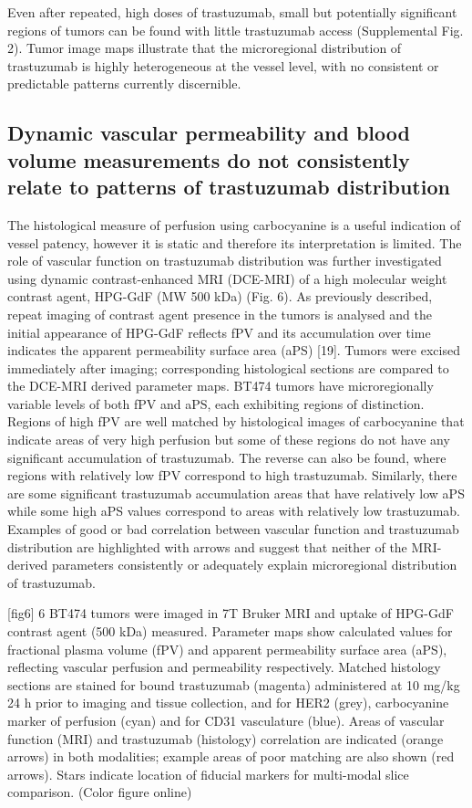 Even after repeated, high doses of trastuzumab, small but potentially significant regions of tumors can be found with little trastuzumab access (Supplemental Fig.
2).
Tumor image maps illustrate that the microregional distribution of trastuzumab is highly heterogeneous at the vessel level, with no consistent or predictable patterns currently discernible.

\subsection{Dynamic vascular permeability and blood volume measurements do not consistently relate to patterns of trastuzumab distribution}

The histological measure of perfusion using carbocyanine is a useful indication of vessel patency, however it is static and therefore its interpretation is limited.
The role of vascular function on trastuzumab distribution was further investigated using dynamic contrast-enhanced MRI (DCE-MRI) of a high molecular weight contrast agent, HPG-GdF (MW 500 kDa) (Fig.
6).
As previously described, repeat imaging of contrast agent presence in the tumors is analysed and the initial appearance of HPG-GdF reflects fPV and its accumulation over time indicates the apparent permeability surface area (aPS) [19].
Tumors were excised immediately after imaging; corresponding histological sections are compared to the DCE-MRI derived parameter maps.
BT474 tumors have microregionally variable levels of both fPV and aPS, each exhibiting regions of distinction.
Regions of high fPV are well matched by histological images of carbocyanine that indicate areas of very high perfusion but some of these regions do not have any significant accumulation of trastuzumab.
The reverse can also be found, where regions with relatively low fPV correspond to high trastuzumab.
Similarly, there are some significant trastuzumab accumulation areas that have relatively low aPS while some high aPS values correspond to areas with relatively low trastuzumab.
Examples of good or bad correlation between vascular function and trastuzumab distribution are highlighted with arrows and suggest that neither of the MRI-derived parameters consistently or adequately explain microregional distribution of trastuzumab.

[fig6]
6
BT474 tumors were imaged in 7T Bruker MRI and uptake of HPG-GdF contrast agent (500 kDa) measured.
Parameter maps show calculated values for fractional plasma volume (fPV) and apparent permeability surface area (aPS), reflecting vascular perfusion and permeability respectively.
Matched histology sections are stained for bound trastuzumab (magenta) administered at 10 mg/kg 24 h prior to imaging and tissue collection, and for HER2 (grey), carbocyanine marker of perfusion (cyan) and for CD31 vasculature (blue).
Areas of vascular function (MRI) and trastuzumab (histology) correlation are indicated (orange arrows) in both modalities; example areas of poor matching are also shown (red arrows).
Stars indicate location of fiducial markers for multi-modal slice comparison.
(Color figure online)

